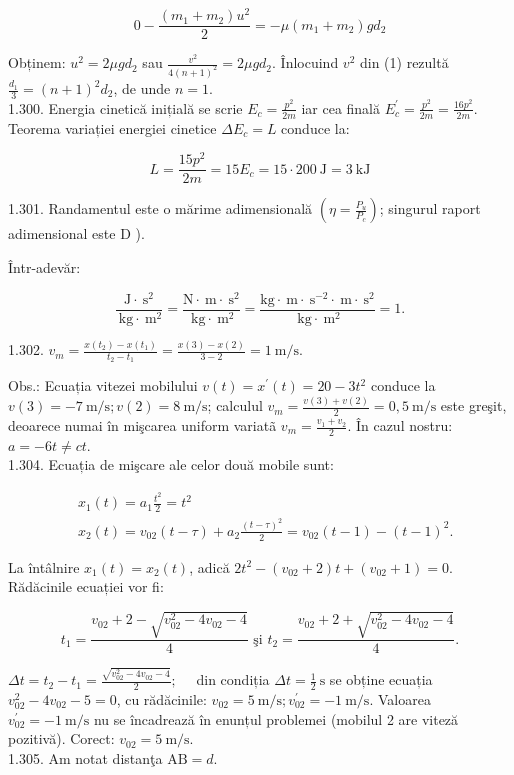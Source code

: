 $$
0-\frac{\left(m_{1}+m_{2}\right) u^{2}}{2}=-\mu\left(m_{1}+m_{2}\right) g d_{2}
$$

Obținem: $u^{2}=2 \mu g d_{2}$ sau $\frac{v^{2}}{4(n+1)^{2}}=2 \mu g d_{2}$. Înlocuind $v^{2}$ din (1) rezultă $\frac{d_{1}}{3}=(n+1)^{2} d_{2}$, de unde $n=1$.\\
1.300. Energia cinetică inițială se scrie $E_{c}=\frac{p^{2}}{2 m}$ iar cea finală $E_{c}^{\prime}=\frac{p^{2}}{2 m}=\frac{16 p^{2}}{2 m}$. Teorema variației energiei cinetice $\Delta E_{c}=L$ conduce la:

$$
L=\frac{15 p^{2}}{2 m}=15 E_{c}=15 \cdot 200 \mathrm{~J}=3 \mathrm{~kJ}
$$

1.301. Randamentul este o mărime adimensională $\left(\eta=\frac{P_{u}}{P_{c}}\right)$; singurul raport adimensional este D ).

Într-adevăr:

$$
\frac{\mathrm{J} \cdot \mathrm{~s}^{2}}{\mathrm{~kg} \cdot \mathrm{~m}^{2}}=\frac{\mathrm{N} \cdot \mathrm{~m} \cdot \mathrm{~s}^{2}}{\mathrm{~kg} \cdot \mathrm{~m}^{2}}=\frac{\mathrm{kg} \cdot \mathrm{~m} \cdot \mathrm{~s}^{-2} \cdot \mathrm{~m} \cdot \mathrm{~s}^{2}}{\mathrm{~kg} \cdot \mathrm{~m}^{2}}=1 .
$$

1.302. $v_{m}=\frac{x\left(t_{2}\right)-x\left(t_{1}\right)}{t_{2}-t_{1}}=\frac{x(3)-x(2)}{3-2}=1 \mathrm{~m} / \mathrm{s}$.

Obs.: Ecuația vitezei mobilului $v(t)=x^{\prime}(t)=20-3 t^{2}$ conduce la $v(3)=-7 \mathrm{~m} / \mathrm{s} ; v(2)=8 \mathrm{~m} / \mathrm{s}$; calculul $v_{m}=\frac{v(3)+v(2)}{2}=0,5 \mathrm{~m} / \mathrm{s}$ este greşit, deoarece numai în mişcarea uniform variatã $v_{m}=\frac{v_{1}+v_{2}}{2}$. În cazul nostru: $a=-6 t \neq c t$.\\
1.304. Ecuația de mişcare ale celor două mobile sunt:

$$
\begin{aligned}
& x_{1}(t)=a_{1} \frac{t^{2}}{2}=t^{2} \\
& x_{2}(t)=v_{02}(t-\tau)+a_{2} \frac{(t-\tau)^{2}}{2}=v_{02}(t-1)-(t-1)^{2} .
\end{aligned}
$$

La întâlnire $x_{1}(t)=x_{2}(t)$, adică $2 t^{2}-\left(v_{02}+2\right) t+\left(v_{02}+1\right)=0$. Rădăcinile ecuației vor fi:

$$
t_{1}=\frac{v_{02}+2-\sqrt{v_{02}^{2}-4 v_{02}-4}}{4} \text { şi } t_{2}=\frac{v_{02}+2+\sqrt{v_{02}^{2}-4 v_{02}-4}}{4} .
$$

$\Delta t=t_{2}-t_{1}=\frac{\sqrt{v_{02}^{2}-4 v_{02}-4}}{2} ; \quad$ din condiția $\Delta t=\frac{1}{2} \mathrm{~s}$ se obține ecuația $v_{02}^{2}-4 v_{02}-5=0$, cu rădăcinile: $v_{02}=5 \mathrm{~m} / \mathrm{s} ; v_{02}^{\prime}=-1 \mathrm{~m} / \mathrm{s}$. Valoarea $v_{02}^{\prime}=-1 \mathrm{~m} / \mathrm{s}$ nu se încadrează în enunțul problemei (mobilul 2 are viteză pozitivă). Corect: $v_{02}=5 \mathrm{~m} / \mathrm{s}$.\\
1.305. Am notat distanţa $\mathrm{AB}=d$.

